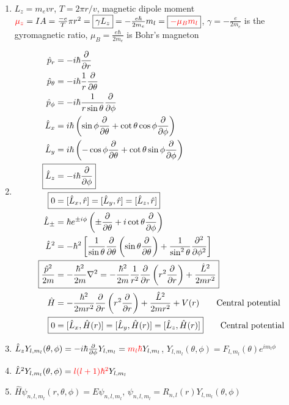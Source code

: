 \documentclass{article}
\theoremstyle{remark}
\theoremstyle{remark}
\begin{document}
\begin{enumerate}
    \item $L_z = m_e vr$, $T=2\pi r/v$, magnetic dipole moment $\textcolor{red}{\mu_z}=IA=\frac{-e}{T}\pi r^2=\boxed{\gamma L_z} = -\frac{e\hbar}{2m_e}m_l=\boxed{\textcolor{red}{-\mu_B m_l}}$, $\boxed{\gamma=-\frac{e}{2m_e}}$ is the gyromagnetic ratio, $\boxed{\mu_B=\frac{e\hbar}{2m_e}}$ is Bohr's magneton
    \item \begin{align}
        \hat{p}_r&=-i\hbar\pdv{r}\\
        \hat{p}_\theta&=-i\hbar\frac{1}{r}\pdv{\theta}\\
        \hat{p}_\phi&=-i\hbar\frac{1}{r\sin\theta}\pdv{\phi}\\
        \hat{L}_x &= i\hbar\left(\sin\phi\pdv{\theta}+\cot\theta\cos\phi\pdv{\phi}\right)\\
        \hat{L}_y &= i\hbar\left(-\cos\phi\pdv{\theta}+\cot\theta\sin\phi\pdv{\phi}\right)\\
        \Aboxed{\hat{L}_z&=-i\hbar\pdv{\phi}}\\
        \Aboxed{0&=[\hat{L}_x,\hat{r}] = [\hat{L}_y,\hat{r}]=[\hat{L}_z,\hat{r}]}\\
        \hat{L}_{\pm}&=\hbar e^{\pm i\phi}\left(\pm\pdv{\theta}+i\cot\theta\pdv\phi\right)\\
        \hat{L}^2 &= -\hbar^2\left[\frac{1}{\sin\theta}\pdv{\theta}\left(\sin\theta\pdv{\theta}\right)+\frac{1}{\sin^2\theta}\pdv[2]{\phi}\right]\\
        \Aboxed{\frac{\hat{p}^2}{2m} &= -\frac{\hbar^2}{2m}\nabla^2=-\frac{\hbar^2}{2m}\frac{1}{r^2}\pdv{r}\left(r^2\pdv{r}\right)+\frac{\hat{L}^2}{2mr^2}} \label{eq:Spherical_Hamiltonian_Simplified}\\
        \hat{H} &= -\frac{\hbar^2}{2mr^2}\pdv{r}\left(r^2\pdv{r}\right)+\frac{\hat{L}^2}{2mr^2}+V(r)\qquad \text{Central potential}\\
        \Aboxed{0&=[\hat{L}_x,\hat{H}(r)] = [\hat{L}_y,\hat{H}(r)]=[\hat{L}_z,\hat{H}(r)]}\qquad \text{Central potential}
    \end{align}
    \item $\hat{L}_z Y_{l,m_l}(\theta,\phi)=-i\hbar\pdv{\phi}Y_{l,m_l}=\textcolor{red}{m_l\hbar} Y_{l,m_l}$, $\boxed{Y_{l,m_l}(\theta,\phi)=F_{l,m_l}(\theta)e^{i m_l\phi}}$
    \item $\hat{L}^2 Y_{l,m_l}(\theta,\phi) = \textcolor{red}{l(l+1)\hbar^2} Y_{l,m_l}$
    \item $\hat{H}\psi_{n,l,m_l}(r,\theta,\phi)=E\psi_{n,l,m_l}$, $\psi_{n,l,m_l}=R_{n,l}(r)Y_{l,m_l}(\theta,\phi)$
    

\end{enumerate}
\end{document}
